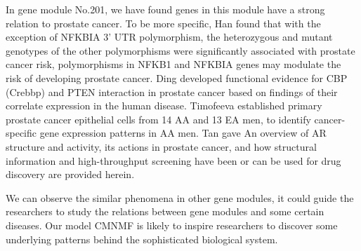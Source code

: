 \documentclass{bmcart}
\begin{document}
In gene module No.201, we have found genes in this module have a strong relation to prostate cancer. To be more specific, Han \cite{Han2015} found that with the exception of NFKBIA 3' UTR polymorphism, the heterozygous and mutant genotypes of the other polymorphisms were significantly associated with prostate cancer risk, polymorphisms in NFKB1 and NFKBIA genes may modulate the risk of developing prostate cancer. Ding \cite{Ding2014} developed functional evidence for CBP (Crebbp) and PTEN interaction in prostate cancer based on findings of their correlate expression in the human disease.  Timofeeva \cite{Timofeeva2009} established primary prostate cancer epithelial cells from 14 AA and 13 EA men, to identify cancer-specific gene expression patterns in AA men.
Tan \cite{Tan2015} gave An overview of AR structure and activity, its actions in prostate cancer, and how structural information and high-throughput screening have been or can be used for drug discovery are provided herein.


 We can observe the similar phenomena in other gene modules, it could guide the researchers to study the relations between gene modules and some certain diseases. Our model CMNMF is likely to inspire researchers to discover some underlying patterns behind the sophisticated biological system.
\end{document}
